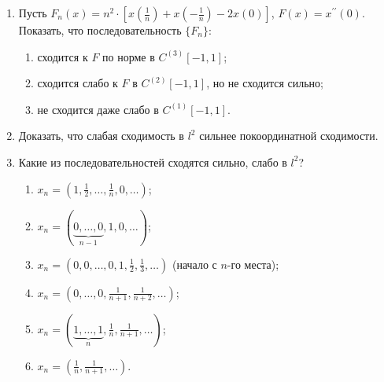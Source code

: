 \documentclass[12pt,a4paper]{article}
\begin{document}
\begin{enumerate}
\item Пусть $F_{n}(x) = n^{2} \cdot \left[x(\frac{1}{n}) + x(-\frac{1}{n}) - 2x(0)\right]$, $F(x) = x^{\prime\prime}(0)$. Показать, что последовательность $\{F_{n}\}$:
\begin{enumerate}[label=\alph*)]
\item сходится к $F$ по норме в $C^{(3)}[-1,1]$;
\item сходится слабо к $F$ в $C^{(2)}[-1,1]$, но не сходится сильно;
\item не сходится даже слабо в $C^{(1)}[-1,1]$.
\end{enumerate}

\item Доказать, что слабая сходимость в $l^{2}$ сильнее покоординатной сходимости.

\item Какие из последовательностей сходятся сильно, слабо в $l^{2}$?
\begin{enumerate}[label=\alph*)]
\item $x_{n} = (1, \frac{1}{2}, \dots, \frac{1}{n}, 0, \dots)$;
\item $x_{n} = (\underbrace{0, \dots, 0}_{n-1}, 1, 0, \dots)$;
\item $x_{n} = (0, 0, \dots, 0, 1, \frac{1}{2}, \frac{1}{3}, \dots)$ (начало с $n$-го места);
\item $x_{n} = (0, \dots, 0, \frac{1}{n+1}, \frac{1}{n+2}, \dots)$;
\item $x_{n} = (\underbrace{1, \dots, 1}_{n}, \frac{1}{n}, \frac{1}{n+1}, \dots)$;
\item $x_{n} = (\frac{1}{n}, \frac{1}{n+1}, \dots)$.
\end{enumerate}


\end{enumerate}
\end{document}
